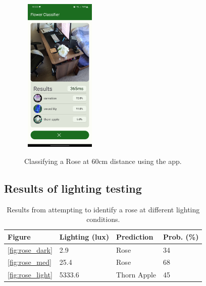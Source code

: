\documentclass{article}
\begin{document}
\begin{figure}[h]\
    \includegraphics[width=0.3\textwidth]{rose_60cm.jpg}
    \caption{Classifying a Rose at 60cm distance using the app.}
    \label{fig:rose_60}
\end{figure}

\clearpage

\subsection{Results of lighting testing}
\label{subsec:lighting}

\begin{table}[h!]
    \begin{tabular}{ |m{1cm}|m{2.5cm}|m{2cm}|m{2cm}| }
        \hline
        Figure & Lighting (lux) & Prediction & Prob. (\%)\\
        \hline
        \ref{fig:rose_dark} & 2.9 & Rose & 34 \\
        \hline
        \ref{fig:rose_med} & 25.4 & Rose & 68 \\
        \hline
        \ref{fig:rose_light} & 5333.6 & Thorn Apple & 45 \\
        \hline
    \end{tabular}
    \caption{Results from attempting to identify a rose at different lighting conditions.}
    \label{table:lighting}
\end{table}
\end{document}
